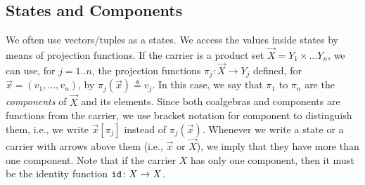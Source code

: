 \subsection{States and Components}
We often use vectors/tuples as a states. We access the values inside states by means of projection functions. If the carrier is a product set $\vec{X}=Y_1 \times\ldots Y_n$, we can use, for $j=1..n$, the projection functions $\pi_j\colon \vec{X}\rightarrow Y_j$ defined, for $\vec{x}=(v_1,\ldots,v_n)$, by $\pi_j(\vec{x})\triangleq v_j$. In this case, we say that $\pi_1$ to $\pi_n$ are the \emph{components} of $\vec{X}$ and its elements. Since both coalgebras and components are functions from the carrier, we use bracket notation for component to distinguish them, i.e., we write $\vec{x}[\pi_j]$ instead of $\pi_j(\vec{x})$.  %
Whenever we write a state or a carrier  with arrows above them (i.e., $\vec{x}$ or $\vec{X}$), we imply that they have more than one component. Note that if the carrier $X$ has only one component, then it must be the identity function ${\texttt{id}}\colon X\rightarrow X$. 
%
